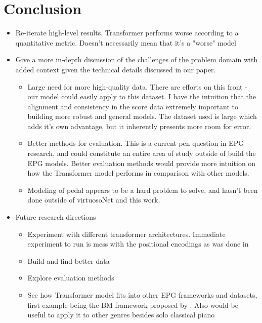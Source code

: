 \chapter{Conclusion} \label{ch:ch7}

\begin{itemize}
    \item Re-iterate high-level results. Transformer performs worse according to a quantitative metric. Doesn't necessarily mean that it's a "worse" model 
    \item Give a more in-depth discussion of the challenges of the problem domain with added context given the technical details discussed in our paper.
    \begin{itemize}
        \item Large need for more high-quality data. There are efforts on this front \cite{foscarin2020asap} - our model could easily apply to this dataset. I have the intuition that the alignment and consistency in the score data extremely important to building more robust and general models. The dataset used is large which adds it's own advantage, but it inherently presents more room for error. 
        \item Better methods for evaluation. This is a current pen question in EPG research, and could constitute an entire area of study outside of build the EPG models. Better evaluation methods would provide more intuition on how the Transformer model performs in comparison with other models. 
        \item Modeling of pedal appears to be a hard problem to solve, and hasn't been done outside of virtuosoNet and this work.
    \end{itemize}
    \item Future research directions
    \begin{itemize}
        \item Experiment with different transformer architectures. Immediate experiment to run is mess with the positional encodings as was done in \cite{huang2018music}
        \item Build and find better data 
        \item Explore evaluation methods
        \item See how Transformer model fits into other EPG frameworks and datasets, first example being the BM framework proposed by \cite{eduardo2018computational}. Also would be useful to apply it to other genres besides solo classical piano
    \end{itemize}

\end{itemize}
